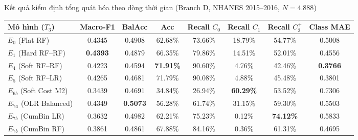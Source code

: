 \begin{table}{Kết quả kiểm định tổng quát hóa theo dòng thời gian (Branch D, NHANES 2015--2016, $N = 4.888$)}
\centering
\small
\setlength{\tabcolsep}{4.5pt}
\label{tab:multicycle-temporal-results}
\begin{tabular}{l c c c c c c c}
\toprule
\textbf{Mô hình ($T_3$)} & \textbf{Macro-F1} & \textbf{BalAcc} & \textbf{Acc} & \textbf{Recall $C_0$} & \textbf{Recall $C_1$} & \textbf{Recall $C_2^+$} & \textbf{Class MAE} \\
\midrule
$E_0$ (Flat RF)                     & 0.4345 & 0.4908 & 62.68\% & 73.66\% & 18.79\% & 54.77\% & 0.5008 \\
$E_1$ (Hard RF--RF)                 & \textbf{0.4393} & 0.4879 & 66.35\% & 79.86\% & 14.51\% & 52.01\% & 0.4556 \\
$E_4$ (Soft RF--RF)                 & 0.4223 & 0.4594 & \textbf{71.91\%} & 90.60\% & 4.76\% & 42.46\% & \textbf{0.3766} \\
$E_5$ (Soft RF--LR)                 & 0.4265 & 0.4681 & 71.79\% & 90.08\% & 4.88\% & 45.48\% & 0.3801 \\
$E_{6b}$ (Soft Cost M2)             & 0.3439 & 0.4691 & 34.84\% & 26.94\% & \textbf{60.29\%} & 53.52\% & 0.7306 \\
$E_{7a}$ (OLR Balanced)             & 0.4349 & \textbf{0.5073} & 56.28\% & 61.74\% & 31.15\% & 59.30\% & 0.5503 \\
$E_{7b}$ (CumBin LR)                & 0.3632 & 0.4982 & 62.21\% & 75.23\% & 0.12\% & \textbf{74.12\%} & 0.5833 \\
$E_{7b}$ (CumBin RF)                & 0.3861 & 0.4861 & 67.88\% & 84.16\% & 0.36\% & 61.31\% & 0.4695 \\
\bottomrule
\end{tabular}
\end{table}

